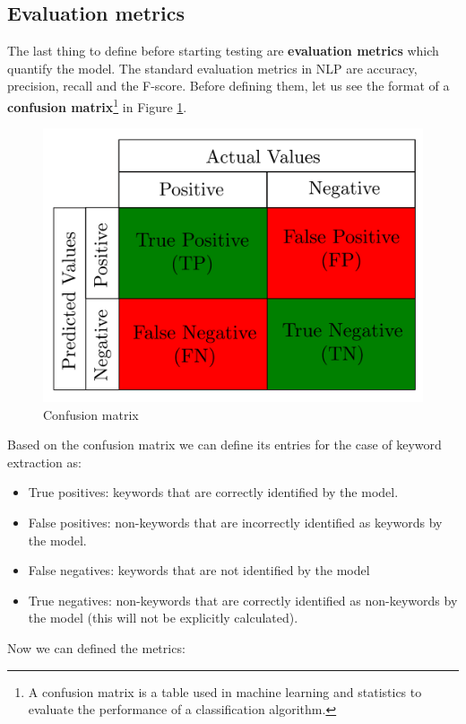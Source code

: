 \documentclass[12pt]{article}
\numberwithin{equation}{section}
\begin{document}
\begin{spacing}{1.5}
	\subsection{Evaluation metrics}
	The last thing to define before starting testing are \textbf{evaluation metrics} which quantify the model. The standard evaluation metrics in NLP are accuracy, precision, recall and the F-score. Before defining them, let us see the format of a \textbf{confusion matrix}\footnote{A confusion matrix is a table used in machine learning and statistics to evaluate the performance of a classification algorithm.} in Figure \ref{confusion}.
	
	\begin{figure}[H]
		\centering
		\includegraphics[scale=0.40]{confusion}		
		\caption{Confusion matrix}
		\label{confusion}
	\end{figure}
	Based on the confusion matrix we can define its entries for the case of keyword extraction as:
	\begin{itemize}
		\item True positives: keywords that are correctly identified by the model.
		\item False positives: non-keywords that are incorrectly identified as keywords by the model.
		\item False negatives: keywords that are not identified by the model
		\item True negatives: non-keywords that are correctly identified as non-keywords by the model (this will not be explicitly calculated). 
	\end{itemize}
	Now we can defined the metrics:

\end{spacing}
\end{document}
